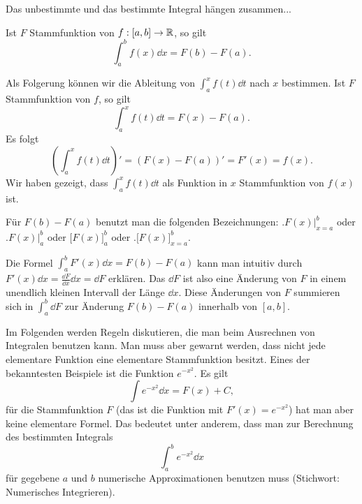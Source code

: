 \begin{bem}
	Das unbestimmte und das bestimmte Integral hängen zusammen... 
\end{bem} 

\begin{thm}  
	Ist $F$ Stammfunktion von $f : [a,b] \to \mathbb{R}$, so gilt 
	\[
		\int_a^b f(x) \dd x = F(b) - F(a). 
	\]
\end{thm} 

\begin{bem} 
	Als Folgerung können wir die Ableitung von $\int_a^x f(t) \dd t$ nach $x$ bestimmen. Ist $F$ Stammfunktion von $f$, so gilt 
	\[
		\int_a^x f(t) \dd t = F(x) - F(a).
	\]
	Es folgt
	\[
		\left(\int_a^x f(t) \dd t \right)' = (F(x)-F(a))' = F'(x) = f(x). 
	\]
	Wir haben gezeigt, dass $\int_a^x f(t) \dd t$ als Funktion in $x$ Stammfunktion von $f(x)$ ist. 
\end{bem} 

\begin{bem} 
	Für $F(b) - F(a)$ benutzt man die folgenden Bezeichnungen:  $\bigl.F(x)\bigr|_{x=a}^b$  oder $\bigl.F(x)\bigr|_a^b$ oder  $\bigl[ F(x) \bigr]_a^b$ oder $\bigl.[ F(x) \bigr]_{x=a}^b$.
\end{bem} 

\begin{bem} 
	Die Formel $\int_a^b F'(x) \dd x = F(b) - F(a)$ kann man intuitiv durch $F'(x) \dd x = \frac{\dd F}{\dd x} \dd x = \dd F$ erklären. Das $\dd F$ ist also eine Änderung von $F$ in einem unendlich kleinen Intervall der Länge $\dd x$. Diese Änderungen von $F$ summieren sich in $\int_a^b \dd F$ zur Änderung $F(b) - F(a)$ innerhalb von $[a,b]$. 
\end{bem} 

\begin{bem} 
	Im Folgenden werden Regeln diskutieren, die man beim Ausrechnen von Integralen benutzen kann. Man muss aber gewarnt werden, dass nicht jede elementare Funktion eine elementare Stammfunktion besitzt.  Eines der bekanntesten Beispiele ist die Funktion $e^{-x^2}$. Es gilt
	\[
		\int e^{-x^2} \dd x = F(x) + C,
	\]
	für die Stammfunktion $F$ (das  ist die Funktion mit $F'(x) = e^{-x^2}$) hat man aber keine elementare Formel. Das bedeutet unter anderem, dass man zur Berechnung des bestimmten Integrals 
	\[
		\int_a^b e^{-x^2} \dd x
	\]
	für gegebene $a$ und $b$ numerische Approximationen benutzen muss (Stichwort: Numerisches Integrieren). 
\end{bem} 

